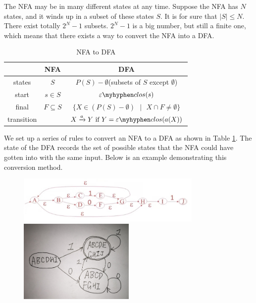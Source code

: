 The NFA may be in many different states at any time. Suppose the NFA has $N$ states, and it winds up in a subset of these states $S$. It is for sure that $\lvert S\rvert \le N$. There exist totally $2^N-1$ subsets. $2^N-1$ is a big number, but still a finite one, which means that there exists a way to convert the NFA into a DFA.
\begin{table}[ht]
\centering
\caption{NFA to DFA}\label{nfa2dfa}
\begin{tabular}{c|c|c}
& NFA & DFA \\\hline
states & $S$ & $P(S)-\emptyset$(subsets of $S$ except $\emptyset$)\\
start & $s\in S$ & $\varepsilon\myhyphen clos(s)$\\
final & $F\subseteq S$ & $\{X\in (P(S)-\emptyset)\text{ }|\text{ } X\cap F \neq \emptyset\}$\\
transition &&$X\xrightarrow{a}Y\text{ if }Y = \varepsilon\myhyphen clos(a(X))$\\
\end{tabular}
\end{table}
We set up a series of rules to convert an NFA to a DFA as shown in Table \ref{nfa2dfa}. The state of the DFA records the set of possible states that the NFA could have gotten into with the same input. Below is an example demonstrating this conversion method.
\begin{figure}[H]
\centering
\includegraphics[width=0.8\textwidth]{nfatodfa1.jpg}
\includegraphics[width=0.5\textwidth]{nfa2dfa2.jpg}
\end{figure}
